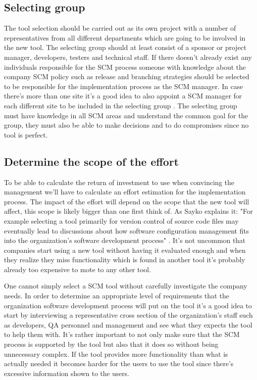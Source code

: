 \documentclass[10pt]{article}
\begin{document}
\subsection{Selecting group}
The tool selection should be carried out as its own project with a number of representatives from all different departments which are going to be involved in the new tool. The selecting group should at least consist of a sponsor or project manager, developers, testers and technical staff\cite{Sayko}. If there doesn't already exist any individuals responsible for the SCM process someone with knowledge about the company SCM policy such as release and branching strategies should be selected to be responsible for the implementation process as the SCM manager. In case there's more than one site it's a good idea to also appoint a SCM manager for each different site to be included in the selecting group \cite{ABB}. The selecting group must have knowledge in all SCM areas and understand the common goal for the group, they must also be able to make decisions and to do compromises since no tool is perfect.\cite{Sayko}

\subsection{Determine the scope of the effort}
To be able to calculate the return of investment to use when convincing the management we'll have to calculate an effort estimation for the implementation process. The impact of the effort will depend on the scope that the new tool will affect, this scope is likely bigger than one first think of. As Sayko explains it: "For example selecting a tool primarily for version control of source code files may eventually lead to discussions about how software configuration management fits into the organization's software development process" \cite{Sayko}. It's not uncommon that companies start using a new tool without having it evaluated enough and when they realize they miss functionality which is found in another tool it's probably already too expensive to mote to any other tool.

\noindent One cannot simply select a SCM tool without carefully investigate the company needs. In order to determine an appropriate level of requirements that the organization software development process will put on the tool it's a good idea to start by interviewing a representative cross section of the organization's staff such as developers, QA personnel and management and see what they expects the tool to help them with.\cite{Sayko}
It's rather important to not only make sure that the SCM process is supported by the tool but also that it does so without being unnecessary complex. \cite{ABB} If the tool provides more functionality than what is actually needed it becomes harder for the users to use the tool since there's excessive information shown to the users.
\end{document}
